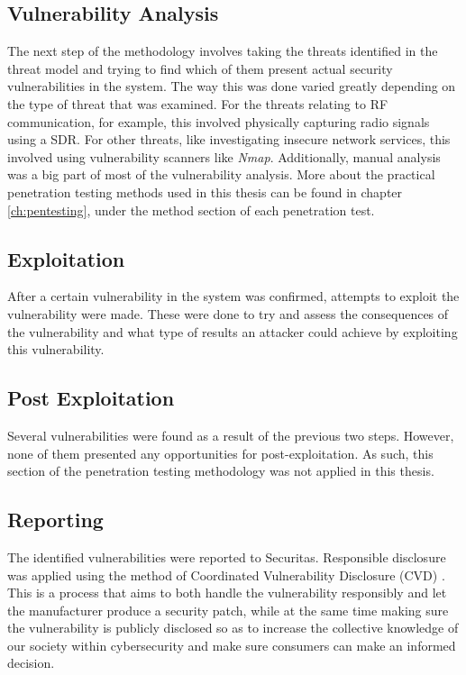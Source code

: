 \subsection{Vulnerability Analysis}
The next step of the methodology involves taking the threats identified in the threat model and trying to find which of them present actual security vulnerabilities in the system. The way this was done varied greatly depending on the type of threat that was examined. For the threats relating to \gls{RF} communication, for example, this involved physically capturing radio signals using a \gls{SDR}. For other threats, like investigating insecure network services, this involved using vulnerability scanners like \textit{Nmap}. Additionally, manual analysis was a big part of most of the vulnerability analysis. More about the practical penetration testing methods used in this thesis can be found in chapter \ref{ch:pentesting}, under the method section of each penetration test.

\subsection{Exploitation}
After a certain vulnerability in the system was confirmed, attempts to exploit the vulnerability were made. These were done to try and assess the consequences of the vulnerability and what type of results an attacker could achieve by exploiting this vulnerability.

\subsection{Post Exploitation}
Several vulnerabilities were found as a result of the previous two steps. However, none of them presented any opportunities for post-exploitation. As such, this section of the penetration testing methodology was not applied in this thesis.

\subsection{Reporting}
The identified vulnerabilities were reported to Securitas. Responsible disclosure was applied using the method of Coordinated Vulnerability Disclosure (CVD) \cite{disclosure-guideline}. This is a process that aims to both handle the vulnerability responsibly and let the manufacturer produce a security patch, while at the same time making sure the vulnerability is publicly disclosed so as to increase the collective knowledge of our society within cybersecurity and make sure consumers can make an informed decision.

